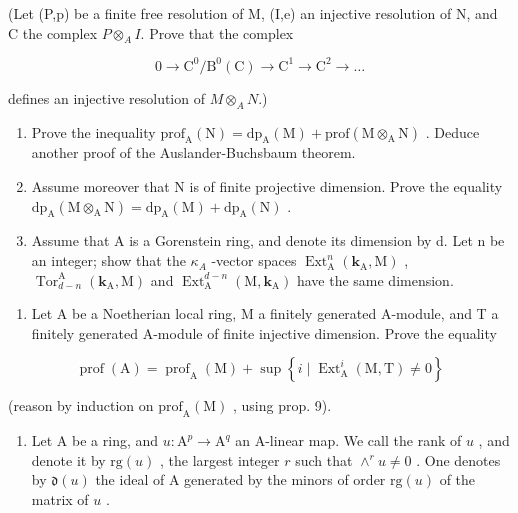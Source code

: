 (Let (P,p) be a finite free resolution of M, (I,e) an injective resolution of N, and C the complex \(P \otimes_A I\). Prove that the complex

\[
0 \to \mathrm{C} ^ {0} / \mathrm{B} ^ {0} (\mathrm{C}) \to \mathrm{C} ^ {1} \to \mathrm{C} ^ {2} \to \dots
\]

defines an injective resolution of \(M \otimes_A N\).)

\begin{enumerate}
\def\labelenumi{\alph{enumi})}
\setcounter{enumi}{1}
\item
  Prove the inequality \(\mathrm{prof}_{\mathrm{A}}(\mathrm{N}) = \mathrm{dp}_{\mathrm{A}}(\mathrm{M}) + \mathrm{prof}(\mathrm{M} \otimes_{\mathrm{A}} \mathrm{N})\) . Deduce another proof of the Auslander-Buchsbaum theorem.
\item
  Assume moreover that N is of finite projective dimension. Prove the equality \(\mathrm{dp}_{\mathrm{A}}(\mathrm{M}\otimes_{\mathrm{A}}\mathrm{N})=\mathrm{dp}_{\mathrm{A}}(\mathrm{M})+\mathrm{dp}_{\mathrm{A}}(\mathrm{N})\) .
\item
  Assume that A is a Gorenstein ring, and denote its dimension by d. Let n be an integer; show that the \(\kappa_{A}\) -vector spaces \(\operatorname{Ext}_{\mathrm{A}}^{n}(\mathbf{k}_{\mathrm{A}},\mathrm{M})\) , \(\operatorname{Tor}_{d-n}^{\mathrm{A}}(\mathbf{k}_{\mathrm{A}},\mathrm{M})\) and \(\operatorname{Ext}_{\mathrm{A}}^{d-n}(\mathrm{M},\mathbf{k}_{\mathrm{A}})\) have the same dimension.
\end{enumerate}

\begin{enumerate}
\def\labelenumi{\arabic{enumi})}
\setcounter{enumi}{6}
\tightlist
\item
  Let A be a Noetherian local ring, M a finitely generated A-module, and T a finitely generated A-module of finite injective dimension. Prove the equality
\end{enumerate}

\[
\operatorname{prof} (\mathrm{A}) = \operatorname{prof} _ {\mathrm{A}} (\mathrm{M}) + \sup \left\{i \mid \operatorname{Ext} _ {\mathrm{A}} ^ {i} (\mathrm{M}, \mathrm{T}) \neq 0 \right\}
\]

(reason by induction on \(\mathrm{prof}_{\mathrm{A}}(\mathrm{M})\) , using prop. 9).

\begin{enumerate}
\def\labelenumi{\arabic{enumi})}
\setcounter{enumi}{7}
\tightlist
\item
  Let A be a ring, and \(u: \mathrm{A}^p \to \mathrm{A}^q\) an A-linear map. We call the rank of \(u\) , and denote it by \(\text{rg}(u)\) , the largest integer \(r\) such that \(\wedge^r u \neq 0\) . One denotes by \(\mathfrak{d}(u)\) the ideal of A generated by the minors of order \(\text{rg}(u)\) of the matrix of \(u\) .
\end{enumerate}

